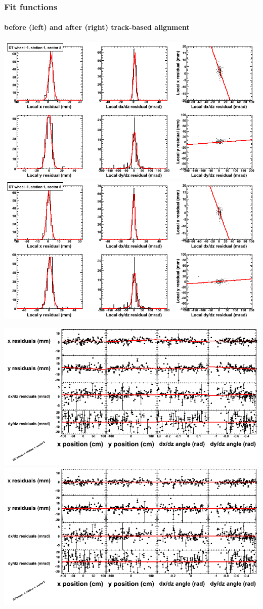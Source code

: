 \documentclass[compress]{beamer}
\begin{document}
\begin{frame}
\frametitle{Fit functions}
\framesubtitle{before (left) and after (right) track-based alignment}
\includegraphics[width=0.5\linewidth]{fitfunctions_re01/MBwhBst1sec05_bellcurves.png} \includegraphics[width=0.5\linewidth]{fitfunctions_re05/MBwhBst1sec05_bellcurves.png}

\includegraphics[width=0.5\linewidth]{fitfunctions_re01/MBwhBst1sec05_polynomials.png} \includegraphics[width=0.5\linewidth]{fitfunctions_re05/MBwhBst1sec05_polynomials.png}
\end{frame}
\end{document}
